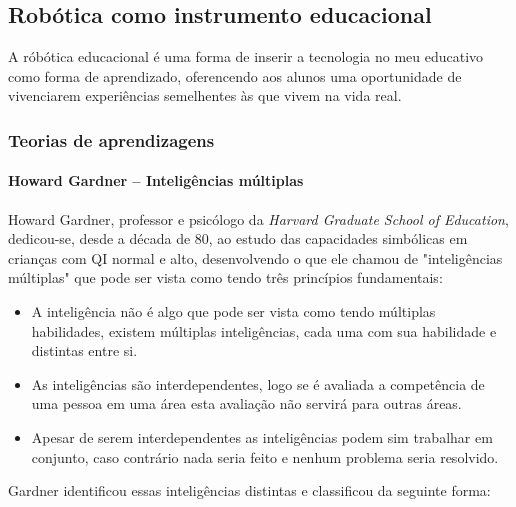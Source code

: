 \subsection{Robótica como instrumento educacional}
A róbótica educacional é uma forma de inserir a tecnologia no meu educativo como forma de aprendizado, oferencendo aos alunos uma oportunidade de vivenciarem experiências semelhentes às que vivem na vida real.
\subsubsection{Teorias de aprendizagens}
\paragraph{Howard Gardner – Inteligências múltiplas}
Howard Gardner, professor e psicólogo da \textit{Harvard Graduate School of Education}, dedicou-se, desde a década de 80, ao estudo das capacidades simbólicas em crianças com QI normal e alto, desenvolvendo o que ele chamou de "inteligências múltiplas" que pode ser vista como tendo três princípios fundamentais:
\begin{itemize}
\item A inteligência não é algo que pode ser vista como tendo múltiplas habilidades, existem múltiplas inteligências, cada uma com sua habilidade e distintas entre si.
\item  As inteligências são interdependentes, logo se é avaliada a competência de uma pessoa em uma área esta avaliação não servirá para outras áreas.
\item Apesar de serem interdependentes as inteligências podem sim trabalhar em conjunto, caso contrário nada seria feito e nenhum problema seria resolvido.
\end{itemize}
Gardner identificou essas inteligências distintas e classificou da seguinte forma:
